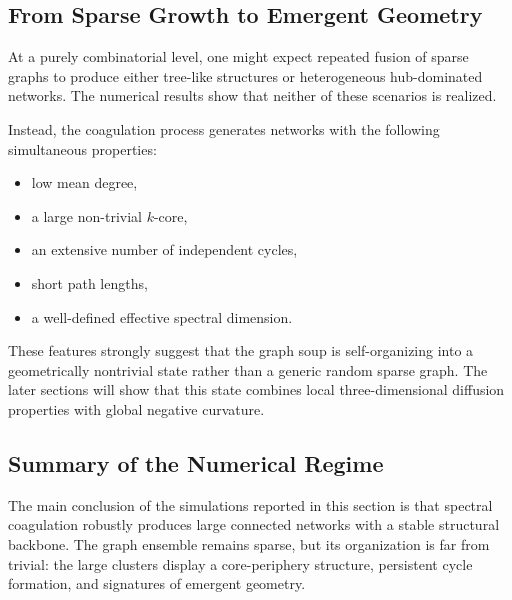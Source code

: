 \documentclass[11pt]{article}
\begin{document}
\subsection{From Sparse Growth to Emergent Geometry}

At a purely combinatorial level, one might expect repeated fusion of sparse graphs to produce either tree-like structures or heterogeneous hub-dominated networks.
The numerical results show that neither of these scenarios is realized.

Instead, the coagulation process generates networks with the following simultaneous properties:

\begin{itemize}
\item low mean degree,
\item a large non-trivial $k$-core,
\item an extensive number of independent cycles,
\item short path lengths,
\item a well-defined effective spectral dimension.
\end{itemize}

These features strongly suggest that the graph soup is self-organizing into a geometrically nontrivial state rather than a generic random sparse graph.
The later sections will show that this state combines local three-dimensional diffusion properties with global negative curvature.

\subsection{Summary of the Numerical Regime}

The main conclusion of the simulations reported in this section is that spectral coagulation robustly produces large connected networks with a stable structural backbone.
The graph ensemble remains sparse, but its organization is far from trivial:
the large clusters display a core-periphery structure, persistent cycle formation, and signatures of emergent geometry.
\end{document}
